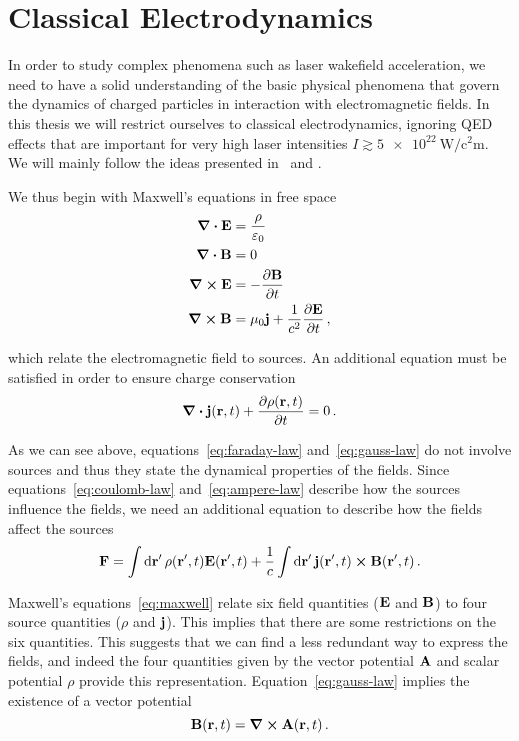 \documentclass[12pt, class=report, crop=false]{standalone}
\begin{document}
\chapter{Classical Electrodynamics}%
\label{chap:classical-electrodynamics}

In order to study complex phenomena such as laser wakefield acceleration,
we need to have a solid understanding of the basic physical phenomena
that govern the dynamics of charged particles in interaction
with electromagnetic fields. In this thesis we will restrict ourselves to
classical electrodynamics, ignoring QED effects that are important
for very high laser intensities \(I \gtrsim \SI{5e22}{\watt\per\square\centi\metre}\).
We will mainly follow the ideas presented in~\textcite{jackson_classicalelectrodynamics_1999} and \textcite[Chapter 2]{eisenberg_nucleartheory_1978}.

We thus begin with Maxwell's equations in free space
\begin{subequations}%
  \label{eq:maxwell}
  \begin{align}
    \div{\vb{E}} & = \frac{\rho}{\varepsilon_0} \label{eq:coulomb-law} \\
    \div{\vb{B}} & = 0 \label{eq:gauss-law} \\
    \curl{\vb{E}} & = - \pdv{\vb{B}}{t} \label{eq:faraday-law} \\
    \curl{\vb{B}} & = \mu_0 \vb{j} + \frac{1}{c^2} \pdv{\vb{E}}{t} \,, \label{eq:ampere-law}
  \end{align}
\end{subequations}

which relate the electromagnetic field to sources. An additional
equation must be satisfied in order to ensure charge conservation
\begin{equation}
  \label{eq:continuity-equation}
  \div{\vb{j}(\vb{r}, t)} + \pdv{\rho(\vb{r}, t)}{t} = 0 \,.
\end{equation}

As we can see above, equations~\eqref{eq:faraday-law} and~\eqref{eq:gauss-law}
do not involve sources and thus they state the dynamical properties of the fields.
Since equations~\eqref{eq:coulomb-law} and~\eqref{eq:ampere-law} describe how
the sources influence the fields, we need an additional equation to describe how
the fields affect the sources
\[
  \vb{F} = \int \dd{\vb{r}'} \rho(\vb{r}', t) \vb{E}(\vb{r}', t) +
           \frac{1}{c} \int \dd{\vb{r}'} \vb{j}(\vb{r}', t) \cross \vb{B}(\vb{r}', t)\,.
\]

Maxwell's equations~\eqref{eq:maxwell} relate six field quantities (\(\vb{E}\) and \(\vb{B}\))
to four source quantities (\(\rho\) and \(\vb{j}\)). This implies that there are some
restrictions on the six quantities. This suggests that we can find a less redundant
way to express the fields, and indeed the four quantities given by the
vector potential \(\vb{A}\) and scalar potential \(\rho\) provide this representation.
Equation~\eqref{eq:gauss-law} implies the existence of a vector potential
\begin{equation}
  \label{eq:vector-potential}
  \vb{B}(\vb{r}, t) = \curl{\vb{A}(\vb{r}, t)}\,.
\end{equation}
\end{document}
